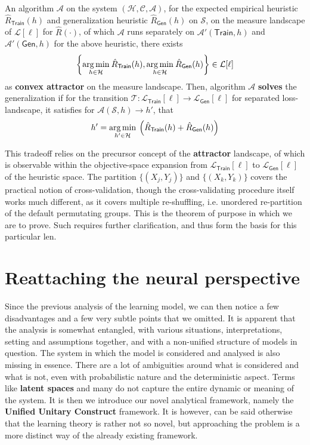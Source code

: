 \begin{theorem}
    An algorithm $\mathcal{A}$ on the system $(\mathcal{H},\mathcal{C},\mathcal{A})$, for the expected empirical heuristic $\hat{R}_{\mathsf{Train}}(h)$ and generalization heuristic $\hat{R}_{\mathsf{Gen}}(h)$ on $\mathcal{S}$, on the measure landscape of $\mathcal{L}[\ell]$ for $\hat{R}(\cdot)$, of which $\mathcal{A}$ runs separately on $\mathcal{A}'(\mathsf{Train},h)$ and $\mathcal{A}'(\mathsf{Gen},h)$ for the above heuristic, there exists \begin{equation}
        \left\{ \underset{h\in \mathcal{H}}{\operatorname*{arg\,min}}\:\hat{R}_{\mathsf{Train}}(h), \underset{h\in \mathcal{H}}{\operatorname*{arg\,min}}\:\hat{R}_{\mathsf{Gen}}(h)\right\}\in \mathcal{L}[\ell]
    \end{equation}
    as \textbf{convex attractor} on the measure landscape. Then, algorithm $\mathcal{A}$ \textbf{solves} the generalization if for the transition $\mathcal{T}:\mathcal{L}_{\mathsf{Train}}[\ell]\to\mathcal{L}_{\mathsf{Gen}}[\ell]$ for separated loss-landscape, it satisfies for $\mathcal{A}(\mathcal{S},h)\to h'$, that 
    \begin{equation}
        h' = \underset{h'\in \mathcal{H}}{\operatorname*{arg\,min}}\: \left(\hat{R}_{\mathsf{Train}}(h) + \hat{R}_{\mathsf{Gen}}(h)\right)
    \end{equation}
\end{theorem}
This tradeoff relies on the precursor concept of the \textbf{attractor} landscape, of which is observable within the objective-space expansion from $\mathcal{L}_{\mathsf{Train}}[\ell]$ to $\mathcal{L}_{\mathsf{Gen}}[\ell]$ of the heuristic space. The partition $\{(X_{j},Y_{j})\}$ and $\{(X_{k},Y_{k})\}$ covers the practical notion of cross-validation, though the cross-validating procedure itself works much different, as it covers multiple re-shuffling, i.e. unordered re-partition of the default permutating groups. This is the theorem of purpose in which we are to prove. Such requires further clarification, and thus form the basis for this particular len. 

\section{Reattaching the neural perspective}

Since the previous analysis of the learning model, we can then notice a few disadvantages and a few very subtle points that we omitted. It is apparent that the analysis is somewhat entangled, with various situations, interpretations, setting and assumptions together, and with a non-unified structure of models in question. The system in which the model is considered and analysed is also missing in essence. There are a lot of ambiguities around what is considered and what is not, even with probabilistic nature and the deterministic aspect. Terms like \textbf{latent spaces} and many do not capture the entire dynamic or meaning of the system. It is then we introduce our novel analytical framework, namely the \textbf{Unified Unitary Construct} framework. It is however, can be said otherwise that the learning theory is rather not so novel, but approaching the problem is a more distinct way of the already existing framework. 
